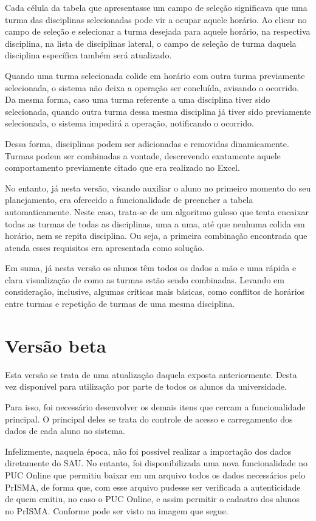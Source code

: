 \documentclass[graduacao,brazil]{ThesisPUC}
\begin{document}
Cada célula da tabela que apresentasse um campo de seleção significava que uma turma das disciplinas selecionadas pode vir a ocupar aquele horário. Ao clicar no campo de seleção e selecionar a turma desejada para aquele horário, na respectiva disciplina, na lista de disciplinas lateral, o campo de seleção de turma daquela disciplina específica também será atualizado.

Quando uma turma selecionada colide em horário com outra turma previamente selecionada, o sistema não deixa a operação ser concluída, avisando o ocorrido. Da mesma forma, caso uma turma referente a uma disciplina tiver sido selecionada, quando outra turma dessa mesma disciplina já tiver sido previamente selecionada, o sistema impedirá a operação, notificando o ocorrido.

Dessa forma, disciplinas podem ser adicionadas e removidas dinamicamente. Turmas podem ser combinadas a vontade, descrevendo exatamente aquele comportamento previamente citado que era realizado no Excel.

No entanto, já nesta versão, visando auxiliar o aluno no primeiro momento do seu planejamento, era oferecido a funcionalidade de preencher a tabela automaticamente. Neste caso, trata-se de um algoritmo guloso que tenta encaixar todas as turmas de todas as disciplinas, uma a uma, até que nenhuma colida em horário, nem se repita disciplina. Ou seja, a primeira combinação encontrada que atenda esses requisitos era apresentada como solução.

Em suma, já nesta versão os alunos têm todos os dados a mão e uma rápida e clara visualização de como as turmas estão sendo combinadas. Levando em consideração, inclusive, algumas críticas mais básicas, como conflitos de horários entre turmas e repetição de turmas de uma mesma disciplina.


\section{Versão beta}

Esta versão se trata de uma atualização daquela exposta anteriormente. Desta vez disponível para utilização por parte de todos os alunos da universidade.

Para isso, foi necessário desenvolver os demais itens que cercam a funcionalidade principal. O principal deles se trata do controle de acesso e carregamento dos dados de cada aluno no sistema.

Infelizmente, naquela época, não foi possível realizar a importação dos dados diretamente do SAU. No entanto, foi disponibilizada uma nova funcionalidade no PUC Online que permitiu baixar em um arquivo todos os dados necessários pelo PrISMA, de forma que, com esse arquivo pudesse ser verificada a autenticidade de quem emitiu, no caso o PUC Online, e assim permitir o cadastro dos alunos no PrISMA. Conforme pode ser visto na imagem que segue.
\end{document}
